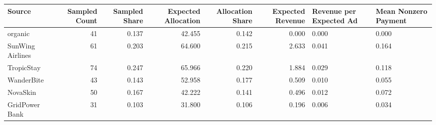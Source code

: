 \begin{tabular}{lrrrrr}
\hline
Source & Sampled Count & Sampled Share & Expected Allocation & Allocation Share & Expected Revenue & Revenue per Expected Ad & Mean Nonzero Payment \\
\hline
organic & 41 & 0.137 & 42.455 & 0.142 & 0.000 & 0.000 & 0.000 \\
SunWing Airlines & 61 & 0.203 & 64.600 & 0.215 & 2.633 & 0.041 & 0.164 \\
TropicStay & 74 & 0.247 & 65.966 & 0.220 & 1.884 & 0.029 & 0.118 \\
WanderBite & 43 & 0.143 & 52.958 & 0.177 & 0.509 & 0.010 & 0.055 \\
NovaSkin & 50 & 0.167 & 42.222 & 0.141 & 0.496 & 0.012 & 0.072 \\
GridPower Bank & 31 & 0.103 & 31.800 & 0.106 & 0.196 & 0.006 & 0.034 \\
\hline
\end{tabular}
